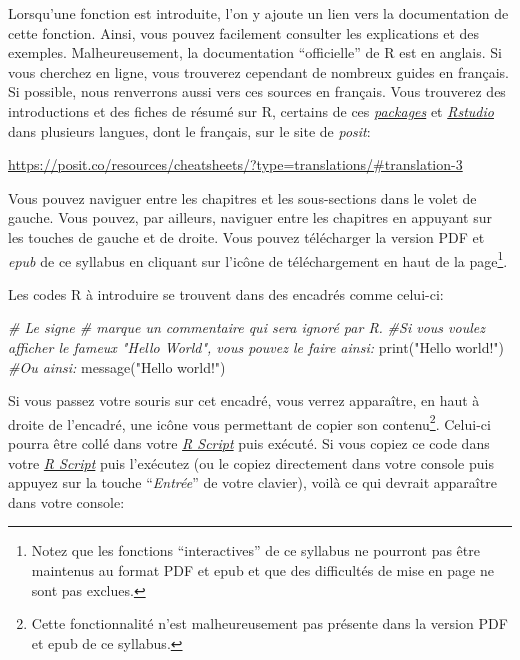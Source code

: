 \documentclass[
]{book}
\newenvironment{Shaded}{\begin{snugshade}}{\end{snugshade}}
\newcommand{\CommentTok}[1]{\textcolor[rgb]{0.56,0.35,0.01}{\textit{#1}}}
\newcommand{\FunctionTok}[1]{\textcolor[rgb]{0.00,0.00,0.00}{#1}}
\newcommand{\NormalTok}[1]{#1}
\newcommand{\StringTok}[1]{\textcolor[rgb]{0.31,0.60,0.02}{#1}}
\begin{document}
Lorsqu'une fonction est introduite, l'on y ajoute un lien vers la documentation de cette fonction. Ainsi, vous pouvez facilement consulter les explications et des exemples. Malheureusement, la documentation ``officielle'' de R est en anglais. Si vous cherchez en ligne, vous trouverez cependant de nombreux guides en français. Si possible, nous renverrons aussi vers ces sources en français. Vous trouverez des introductions et des fiches de résumé sur R, certains de ces \protect\hyperlink{packages}{\emph{packages}} et \href{https://posit.co/}{\emph{Rstudio}} dans plusieurs langues, dont le français, sur le site de \emph{posit}:

\url{https://posit.co/resources/cheatsheets/?type=translations/\#translation-3}

Vous pouvez naviguer entre les chapitres et les sous-sections dans le volet de gauche. Vous pouvez, par ailleurs, naviguer entre les chapitres en appuyant sur les touches de gauche et de droite. Vous pouvez télécharger la version PDF et \emph{epub} de ce syllabus en cliquant sur l'icône de téléchargement en haut de la page\footnote{Notez que les fonctions ``interactives'' de ce syllabus ne pourront pas être maintenus au format PDF et epub et que des difficultés de mise en page ne sont pas exclues.}.

Les codes R à introduire se trouvent dans des encadrés comme celui-ci:

\begin{Shaded}
\begin{Highlighting}[]
\CommentTok{\# Le signe \# marque un commentaire qui sera ignoré par R.}
\CommentTok{\#Si vous voulez afficher le fameux "Hello World", vous pouvez le faire ainsi:}
\FunctionTok{print}\NormalTok{(}\StringTok{"Hello world!"}\NormalTok{)}
\CommentTok{\#Ou ainsi:}
\FunctionTok{message}\NormalTok{(}\StringTok{"Hello world!"}\NormalTok{)}
\end{Highlighting}
\end{Shaded}

Si vous passez votre souris sur cet encadré, vous verrez apparaître, en haut à droite de l'encadré, une icône vous permettant de copier son contenu\footnote{Cette fonctionnalité n'est malheureusement pas présente dans la version PDF et epub de ce syllabus.}. Celui-ci pourra être collé dans votre \protect\hyperlink{Commandes}{\emph{R Script}} puis exécuté. Si vous copiez ce code dans votre \protect\hyperlink{Commandes}{\emph{R Script}} puis l'exécutez (ou le copiez directement dans votre console puis appuyez sur la touche ``\emph{Entrée}'' de votre clavier), voilà ce qui devrait apparaître dans votre console:
\end{document}
